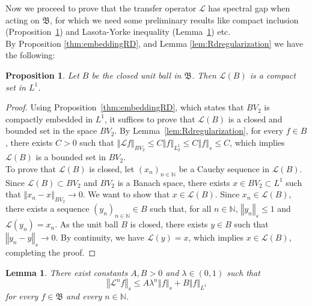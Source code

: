 \documentclass{amsart}
\newtheorem{lemma}[theorem]{Lemma}
\newtheorem{proposition}[theorem]{Proposition}
\newcommand\cL{{\mathcal L}}
\newcommand\bN{{\mathbb N}}
\newcommand\fB{{\mathfrak B}}
\newcommand{\norm}[1]{\left\Vert#1\right\Vert}
\begin{document}
Now we proceed to prove that the transfer operator  $\cL$ has spectral gap when acting on $\fB$, for which we need some preliminary results like compact inclusion (Proposition~\ref{prop:cpt_incl}) and Lasota-Yorke inequality (Lemma~\ref{lem:LY-ineq}) etc.\\
By Proposition \ref{thm:embeddingRD}, and Lemma \ref{lem:Rdregularization} we have the following:

\begin{proposition}\label{prop:cpt_incl}
Let $B$ be the closed unit ball in $\fB$. Then $\cL(B)$ is a compact set in $L^{1}$.
\end{proposition}

\begin{proof} Using Proposition~\ref{thm:embeddingRD}, which states that \(BV_2\) is compactly embedded in \(L^1\), it suffices to prove that \(\cL(B)\) is a closed and bounded set in the space \(BV_2\). 
By Lemma~\ref{lem:Rdregularization}, for every \(f\in B\), there exists \(C>0\) such that \(\norm{\cL f}_{BV_2}\leq C\norm{f}_{L^1_2}\leq C\norm{f}_s\leq C\), which implies \(\cL(B)\) is a bounded set in \(BV_2\). \\
To prove that \(\cL(B)\) is closed, let \((x_n)_{n\in\bN}\) be a Cauchy sequence in \(\cL(B)\). Since \(\cL(B)\subset BV_2\) and \(BV_2\) is a Banach space, there exists \(x\in BV_2\subset L^1\) such that \(\norm{x_n- x}_{BV_2}\to 0\). We want to show that \(x\in \cL(B)\). Since \(x_n\in \cL(B)\), there exists a sequence \((y_n)_{n\in\bN}\in B\) such that, for all \(n\in\bN\), \(\norm{y_n}_s\leq 1\) and \(\cL(y_n)=x_n\). As the unit ball \(B\) is closed, there exists \(y\in B\) such that \(\norm{y_n-y}_s\to 0\). By continuity, we have \(\cL(y)=x\), which implies \(x\in \cL(B)\), completing the proof.
\end{proof}

\begin{lemma}\label{lem:LY-ineq}
There exist constants $A,B>0$ and $\lambda \in \left( 0,1\right) $ such that 
\begin{equation}
\norm{\cL^{n}f}_{s}\leq A\lambda ^{n}\norm{f}_{s}+B\norm{ f}_{L^{1}}  \label{SLY}
\end{equation}%
for every $f\in \fB$ and every $n\in \mathbb{N}$.
\end{lemma}
\end{document}
